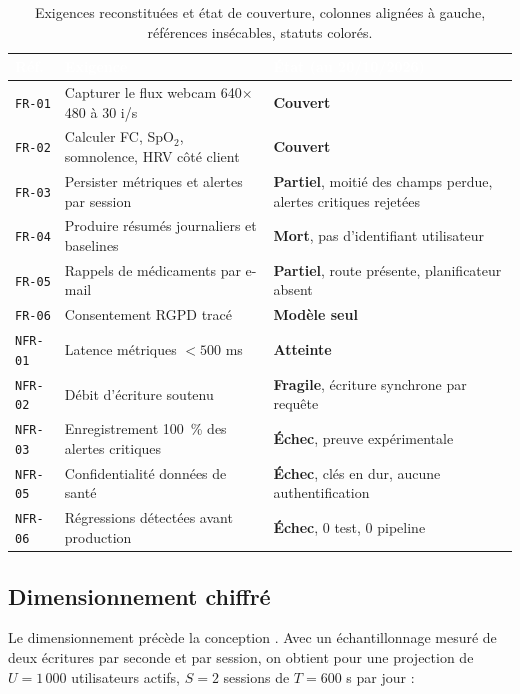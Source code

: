 \documentclass[11pt,a4paper]{article}
\begin{document}
\begin{table}[H]
\centering\small
\begin{tabularx}{\linewidth}{>{\raggedright\arraybackslash}p{1.7cm} >{\raggedright\arraybackslash}X >{\raggedright\arraybackslash}p{4.4cm}}
\toprule
\rowcolor{cwblue} \textcolor{white}{\bf Réf.} & \textcolor{white}{\bf Exigence} & \textcolor{white}{\bf État (au 20/10/2026)} \\
\midrule
\mbox{\texttt{FR-01}} & Capturer le flux webcam 640$\times$480 à 30 i/s & \textcolor{cwgreen}{\textbf{Couvert}} \\
\mbox{\texttt{FR-02}} & Calculer FC, SpO$_2$, somnolence, HRV côté client & \textcolor{cwgreen}{\textbf{Couvert}} \\
\mbox{\texttt{FR-03}} & Persister métriques et alertes par session & \textcolor{cworange}{\textbf{Partiel}}, moitié des champs perdue, alertes critiques rejetées \\
\mbox{\texttt{FR-04}} & Produire résumés journaliers et baselines & \textcolor{cwred}{\textbf{Mort}}, pas d'identifiant utilisateur \\
\mbox{\texttt{FR-05}} & Rappels de médicaments par e-mail & \textcolor{cworange}{\textbf{Partiel}}, route présente, planificateur absent \\
\mbox{\texttt{FR-06}} & Consentement RGPD tracé & \textcolor{cworange}{\textbf{Modèle seul}} \\
\midrule
\mbox{\texttt{NFR-01}} & Latence métriques $< 500$ ms & \textcolor{cwgreen}{\textbf{Atteinte}} \\
\mbox{\texttt{NFR-02}} & Débit d'écriture soutenu & \textcolor{cworange}{\textbf{Fragile}}, écriture synchrone par requête \\
\mbox{\texttt{NFR-03}} & Enregistrement 100~\% des alertes critiques & \textcolor{cwred}{\textbf{Échec}}, preuve expérimentale \\
\mbox{\texttt{NFR-05}} & Confidentialité données de santé & \textcolor{cwred}{\textbf{Échec}}, clés en dur, aucune authentification \\
\mbox{\texttt{NFR-06}} & Régressions détectées avant production & \textcolor{cwred}{\textbf{Échec}}, 0 test, 0 pipeline \\
\bottomrule
\end{tabularx}
\caption{Exigences reconstituées et état de couverture, colonnes alignées à gauche, références insécables, statuts colorés.}
\label{tab:exigences}
\end{table}

\subsection{Dimensionnement chiffré}
Le dimensionnement précède la conception \cite{systemdesignskills}. Avec un échantillonnage mesuré de
deux écritures par seconde et par session, on obtient pour une projection de $U = 1\,000$ utilisateurs
actifs, $S = 2$ sessions de $T = 600$ s par jour :
\end{document}
